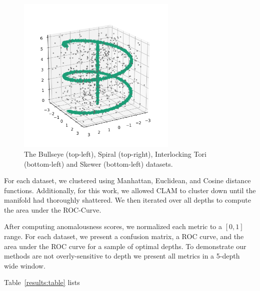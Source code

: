 \begin{figure}[!t]
\includegraphics[width=3in]{static/skewer.png}
\caption{The Bullseye (top-left), Spiral (top-right), Interlocking Tori (bottom-left) and Skewer (bottom-left) datasets.}
\label{results:datasets}
\end{figure}

For each dataset, we clustered using Manhattan, Euclidean, and Cosine distance functions.
Additionally, for this work, we allowed CLAM to cluster down until the manifold had thoroughly shattered.
We then iterated over all depths to compute the area under the ROC-Curve.

After computing anomalousness scores, we normalized each metric to a $[0, 1]$ range.
For each dataset, we present a confusion matrix, a ROC curve, and the area under the ROC curve for a sample of optimal depths. 
To demonstrate our methods are not overly-sensitive to depth we present all metrics in a 5-depth wide window.

Table~\ref{results:table} lists %

